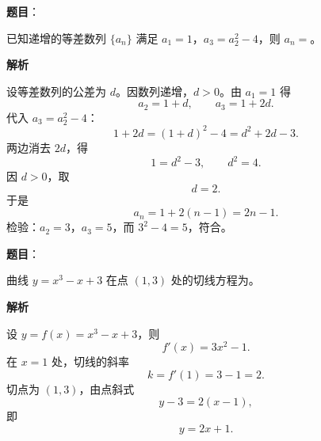 \begin{answer}

\textbf{题目}：

已知递增的等差数列 $\{a_n\}$ 满足 $a_1=1$，$a_3=a_2^2-4$，则 $a_n=$\gkblank{}。

\textbf{解析}

设等差数列的公差为 $d$。因数列递增，$d>0$。由 $a_1=1$ 得
\nopagebreak[4]
\[a_2=1+d,\qquad a_3=1+2d.\]
代入 $a_3=a_2^2-4$：
\nopagebreak[4]
\[1+2d=(1+d)^2-4=d^2+2d-3.\]
两边消去 $2d$，得
\nopagebreak[4]
\[1=d^2-3,\qquad d^2=4.\]
因 $d>0$，取
\nopagebreak[4]
\[d=2.\]
于是
\nopagebreak[4]
\[a_n=1+2(n-1)=2n-1.\]
检验：$a_2=3$，$a_3=5$，而 $3^2-4=5$，符合。


\end{answer}
\begin{answer}

\textbf{题目}：

曲线 $y=x^3-x+3$ 在点 $(1,3)$ 处的切线方程为\gkblank{}。

\textbf{解析}

设 $y=f(x)=x^3-x+3$，则
\nopagebreak[4]
\[f'(x)=3x^2-1.\]
在 $x=1$ 处，切线的斜率
\nopagebreak[4]
\[k=f'(1)=3-1=2.\]
切点为 $(1,3)$，由点斜式
\nopagebreak[4]
\[y-3=2(x-1),\]
即
\nopagebreak[4]
\[y=2x+1.\]


\end{answer}
